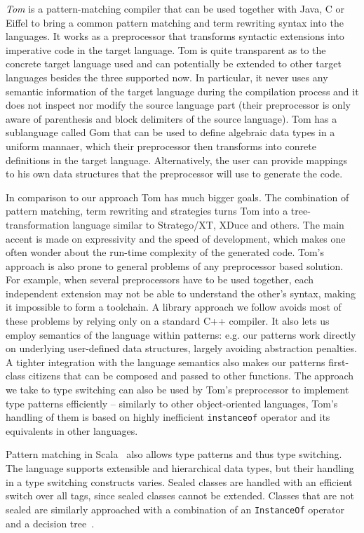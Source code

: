 \documentclass[preprint]{sigplanconf}
\makeatletter
\DeclareRobustCommand{\code}[1]{{\lstinline[breaklines=false,escapechar=@]{#1}}}
\makeatother
\begin{document}
\emph{Tom} is a pattern-matching compiler that can be used together with Java, C or 
Eiffel to bring a common pattern matching and term rewriting syntax into the 
languages\cite{Moreau:2003}. It works as a preprocessor that transforms 
syntactic extensions into imperative code in the target language. Tom is quite 
transparent as to the concrete target language used and can potentially be 
extended to other target languages besides the three supported now. In 
particular, it never uses any semantic information of the target language during 
the compilation process and it does not inspect nor modify the source language 
part (their preprocessor is only aware of parenthesis and block delimiters of 
the source language). Tom has a sublanguage called Gom that can be used to 
define algebraic data types in a uniform mannaer, which their preprocessor then 
transforms into conrete definitions in the target language. Alternatively, the 
user can provide mappings to his own data structures that the preprocessor will 
use to generate the code.

In comparison to our approach Tom has much bigger goals. The combination of 
pattern matching, term rewriting and strategies turns Tom into a 
tree-transformation language similar to Stratego/XT, XDuce and others. 
The main accent is made on expressivity and the speed of development, which 
makes one often wonder about the run-time complexity of the generated code.
Tom's approach is also prone to general problems of any preprocessor based 
solution\cite[]{SELL}. For example, when several preprocessors 
have to be used together, each independent extension may not be able to 
understand the other's syntax, making it impossible to form a toolchain.
A library approach we follow avoids most of these problems by relying only on a 
standard C++ compiler. It also lets us employ semantics of the language within 
patterns: e.g. our patterns work directly on underlying user-defined data 
structures, largely avoiding abstraction penalties. A tighter integration with 
the language semantics also makes our patterns first-class citizens that can be 
composed and passed to other functions. The approach we take to type switching 
can also be used by Tom's preprocessor to implement type patterns efficiently -- 
similarly to other object-oriented languages, Tom's handling of them is based on 
highly inefficient \code{instanceof} operator and its equivalents in other 
languages.

Pattern matching in Scala~\cite{Scala2nd} also allows type patterns and thus type 
switching. The language supports extensible and hierarchical data types, but 
their handling in a type switching constructs varies. Sealed classes are handled 
with an efficient switch over all tags, since sealed classes cannot be extended. 
Classes that are not sealed are similarly approached with a combination of an 
\code{InstanceOf} operator and a decision tree~\cite{EmirThesis}.
\end{document}
